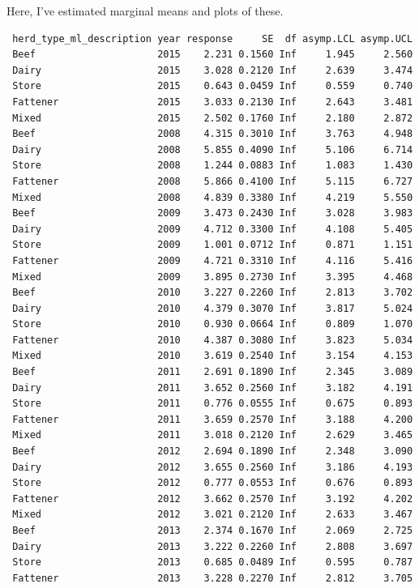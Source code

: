 \documentclass[
  letterpaper,
  DIV=11,
  numbers=noendperiod]{scrreprt}
\begin{document}
Here, I've estimated marginal means and plots of these.

\begin{verbatim}
 herd_type_ml_description year response     SE  df asymp.LCL asymp.UCL
 Beef                     2015    2.231 0.1560 Inf     1.945     2.560
 Dairy                    2015    3.028 0.2120 Inf     2.639     3.474
 Store                    2015    0.643 0.0459 Inf     0.559     0.740
 Fattener                 2015    3.033 0.2130 Inf     2.643     3.481
 Mixed                    2015    2.502 0.1760 Inf     2.180     2.872
 Beef                     2008    4.315 0.3010 Inf     3.763     4.948
 Dairy                    2008    5.855 0.4090 Inf     5.106     6.714
 Store                    2008    1.244 0.0883 Inf     1.083     1.430
 Fattener                 2008    5.866 0.4100 Inf     5.115     6.727
 Mixed                    2008    4.839 0.3380 Inf     4.219     5.550
 Beef                     2009    3.473 0.2430 Inf     3.028     3.983
 Dairy                    2009    4.712 0.3300 Inf     4.108     5.405
 Store                    2009    1.001 0.0712 Inf     0.871     1.151
 Fattener                 2009    4.721 0.3310 Inf     4.116     5.416
 Mixed                    2009    3.895 0.2730 Inf     3.395     4.468
 Beef                     2010    3.227 0.2260 Inf     2.813     3.702
 Dairy                    2010    4.379 0.3070 Inf     3.817     5.024
 Store                    2010    0.930 0.0664 Inf     0.809     1.070
 Fattener                 2010    4.387 0.3080 Inf     3.823     5.034
 Mixed                    2010    3.619 0.2540 Inf     3.154     4.153
 Beef                     2011    2.691 0.1890 Inf     2.345     3.089
 Dairy                    2011    3.652 0.2560 Inf     3.182     4.191
 Store                    2011    0.776 0.0555 Inf     0.675     0.893
 Fattener                 2011    3.659 0.2570 Inf     3.188     4.200
 Mixed                    2011    3.018 0.2120 Inf     2.629     3.465
 Beef                     2012    2.694 0.1890 Inf     2.348     3.090
 Dairy                    2012    3.655 0.2560 Inf     3.186     4.193
 Store                    2012    0.777 0.0553 Inf     0.676     0.893
 Fattener                 2012    3.662 0.2570 Inf     3.192     4.202
 Mixed                    2012    3.021 0.2120 Inf     2.633     3.467
 Beef                     2013    2.374 0.1670 Inf     2.069     2.725
 Dairy                    2013    3.222 0.2260 Inf     2.808     3.697
 Store                    2013    0.685 0.0489 Inf     0.595     0.787
 Fattener                 2013    3.228 0.2270 Inf     2.812     3.705

\end{verbatim}
\end{document}

